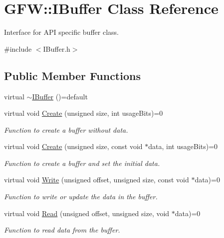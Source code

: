 \hypertarget{class_g_f_w_1_1_i_buffer}{}\section{G\+FW\+:\+:I\+Buffer Class Reference}
\label{class_g_f_w_1_1_i_buffer}


Interface for A\+PI specific buffer class.  




{\ttfamily \#include $<$I\+Buffer.\+h$>$}

\subsection*{Public Member Functions}
\begin{DoxyCompactItemize}
\item 
virtual \hyperlink{class_g_f_w_1_1_i_buffer_aef075064f4de9081c18ff6e4a4847e52}{$\sim$\+I\+Buffer} ()=default
\item 
virtual void \hyperlink{class_g_f_w_1_1_i_buffer_aeda77fc8f158dd79bc28520f92827f92}{Create} (unsigned size, int usage\+Bits)=0
\begin{DoxyCompactList}\small\item\em Function to create a buffer without data. \end{DoxyCompactList}\item 
virtual void \hyperlink{class_g_f_w_1_1_i_buffer_a049c56d462a1a85b4ecb88b417ef5e4e}{Create} (unsigned size, const void $\ast$data, int usage\+Bits)=0
\begin{DoxyCompactList}\small\item\em Function to create a buffer and set the initial data. \end{DoxyCompactList}\item 
virtual void \hyperlink{class_g_f_w_1_1_i_buffer_a3028dee9374054e3e448f8d609df654b}{Write} (unsigned offset, unsigned size, const void $\ast$data)=0
\begin{DoxyCompactList}\small\item\em Function to write or update the data in the buffer. \end{DoxyCompactList}\item 
virtual void \hyperlink{class_g_f_w_1_1_i_buffer_a97c3fbf03423db1abc78a8aa343fed4f}{Read} (unsigned offset, unsigned size, void $\ast$data)=0
\begin{DoxyCompactList}\small\item\em Function to read data from the buffer. \end{DoxyCompactList}\item 

\end{DoxyCompactItemize}

